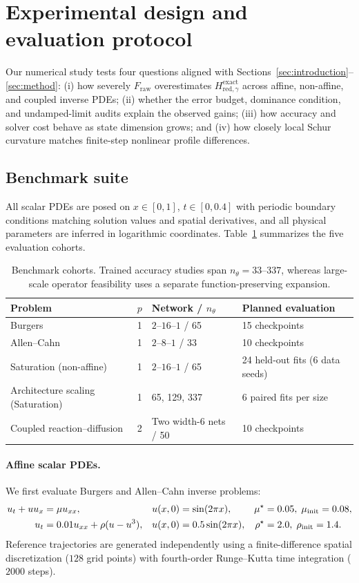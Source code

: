\documentclass[preprint,11pt]{elsarticle}
\newcommand{\Fraw}{F_{\mathrm{raw}}}
\newcommand{\Hred}{H_{\mathrm{red},\gamma}^{\mathrm{exact}}}
\begin{document}
\section{Experimental design and evaluation protocol}
\label{sec:numerical_setup}

Our numerical study tests four questions aligned with Sections~\ref{sec:introduction}--\ref{sec:method}: (i) how severely $\Fraw$ overestimates $\Hred$ across affine, non-affine, and coupled inverse PDEs; (ii) whether the error budget, dominance condition, and undamped-limit audits explain the observed gains; (iii) how accuracy and solver cost behave as state dimension grows; and (iv) how closely local Schur curvature matches finite-step nonlinear profile differences.

\subsection{Benchmark suite}
\label{sec:benchmarks}

All scalar PDEs are posed on $x\in[0,1]$, $t\in[0,0.4]$ with periodic boundary conditions matching solution values and spatial derivatives, and all physical parameters are inferred in logarithmic coordinates.
Table~\ref{tab:design} summarizes the five evaluation cohorts.

\begin{table}[!htbp]
\centering
\caption{Benchmark cohorts. Trained accuracy studies span $n_\theta=33$--$337$, whereas large-scale operator feasibility uses a separate function-preserving expansion.}
\label{tab:design}
\small
\begin{tabular}{lcll}
\toprule
Problem & $p$ & Network / $n_\theta$ & Planned evaluation\\
\midrule
Burgers & 1 & $2$--$16$--$1$ / 65 & 15 checkpoints\\
Allen--Cahn & 1 & $2$--$8$--$1$ / 33 & 10 checkpoints\\
Saturation (non-affine) & 1 & $2$--$16$--$1$ / 65 & 24 held-out fits (6 data seeds)\\
Architecture scaling (Saturation) & 1 & 65, 129, 337 & 6 paired fits per size\\
Coupled reaction--diffusion & 2 & Two width-6 nets / 50 & 10 checkpoints\\
\bottomrule
\end{tabular}
\end{table}

\paragraph{Affine scalar PDEs.}
We first evaluate Burgers and Allen--Cahn inverse problems:
\begin{align}
 u_t+uu_x&=\mu u_{xx}, & u(x,0)&=\sin(2\pi x), & \mu^\star&=0.05,\;\mu_{\rm init}=0.08,\label{eq:burgers_setup}\\
 u_t&=0.01u_{xx}+\rho(u-u^3), & u(x,0)&=0.5\sin(2\pi x), & \rho^\star&=2.0,\;\rho_{\rm init}=1.4.\label{eq:allen_setup}
\end{align}
Reference trajectories are generated independently using a finite-difference spatial discretization ($128$ grid points) with fourth-order Runge--Kutta time integration ($2000$ steps).
\end{document}
